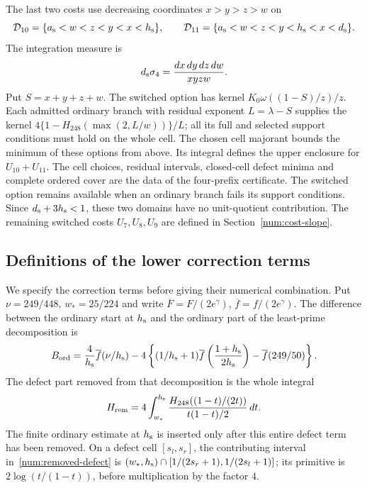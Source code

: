 The last two costs use decreasing coordinates $x>y>z>w$ on
\[
 \mathcal D_{10}=\{{a_{\rm s}}<w<z<y<x<{h_{\rm s}}\},\qquad
 \mathcal D_{11}=\{{a_{\rm s}}<w<z<y<{h_{\rm s}}<x<{d_{\rm s}}\}.
\]
The integration measure is
\[
 {d_{\rm s}}\sigma_4=\frac{dx\,dy\,dz\,dw}{xyzw}.
\]
Put $S=x+y+z+w$. The switched option has kernel
$K_0\omega((1-S)/z)/z$. Each admitted ordinary branch with residual
exponent $L=\lambda-S$ supplies the kernel
$4\{1-H_{248}(\max(2,L/w))\}/L$; all its full and selected support conditions
must hold on the whole cell. The chosen cell majorant bounds the
minimum of these options from above. Its integral defines the upper
enclosure for $U_{10}+U_{11}$. The cell choices, residual intervals,
closed-cell defect minima and complete ordered cover are the data
of the four-prefix certificate. The switched option remains available
when an ordinary branch fails its support conditions. Since ${d_{\rm s}}+3{h_{\rm s}}<1$, these two
domains have no unit-quotient contribution.
The remaining switched costs $U_7,U_8,U_9$ are defined in
Section~\ref{num:cost-slope}.

\subsection{Definitions of the lower correction terms}
\label{num:lower-definitions}
We specify the correction terms before giving their numerical
combination. Put $\nu=249/448$, $w_*=25/224$ and write
$\overline F=F/(2e^\gamma)$, $\overline f=f/(2e^\gamma)$.
The difference between the ordinary start at ${h_{\rm s}}$ and the ordinary
part of the least-prime decomposition is
\begin{equation}
 B_{\rm ord}=\frac4{h_{\rm s}}\overline f(\nu/{h_{\rm s}})
 -4\left\{(1/{h_{\rm s}}+1)\overline f\left(\frac{1+{h_{\rm s}}}{2{h_{\rm s}}}\right)
                   -\overline f(249/50)\right\}.
 \label{num:ordinary-start-difference}
\end{equation}
The defect part removed from that decomposition is the whole integral
\begin{equation}
 H_{\rm rem}=4\int_{w_*}^{{h_{\rm s}}}
   \frac{H_{248}((1-t)/(2t))}{t(1-t)/2}\,dt.
 \label{num:removed-defect}
\end{equation}
The finite ordinary estimate at ${h_{\rm s}}$ is inserted only after this
entire defect term has been removed. On a defect cell $[s_l,s_r]$,
the contributing interval in~\eqref{num:removed-defect} is
$(w_*,{h_{\rm s}})\cap[1/(2s_r+1),1/(2s_l+1)]$; its primitive is
$2\log(t/(1-t))$, before multiplication by the factor $4$.

